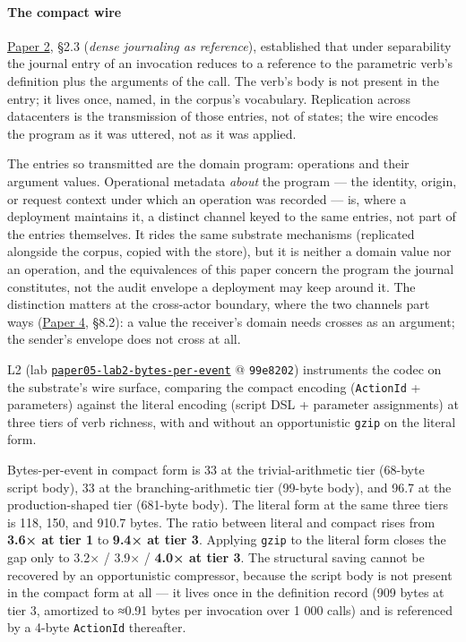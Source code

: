 \documentclass[
]{article}
\begin{document}
\paragraph{The compact wire}\label{the-compact-wire}

\href{02-program-value-separability.md}{Paper 2}, §2.3 (\emph{dense
journaling as reference}), established that under separability the
journal entry of an invocation reduces to a reference to the parametric
verb's definition plus the arguments of the call. The verb's body is not
present in the entry; it lives once, named, in the corpus's vocabulary.
Replication across datacenters is the transmission of those entries, not
of states; the wire encodes the program as it was uttered, not as it was
applied.

The entries so transmitted are the domain program: operations and their
argument values. Operational metadata \emph{about} the program --- the
identity, origin, or request context under which an operation was
recorded --- is, where a deployment maintains it, a distinct channel
keyed to the same entries, not part of the entries themselves. It rides
the same substrate mechanisms (replicated alongside the corpus, copied
with the store), but it is neither a domain value nor an operation, and
the equivalences of this paper concern the program the journal
constitutes, not the audit envelope a deployment may keep around it. The
distinction matters at the cross-actor boundary, where the two channels
part ways (\href{04-cross-actor-continuity.md}{Paper 4}, §8.2): a value
the receiver's domain needs crosses as an argument; the sender's
envelope does not cross at all.

L2 (lab
\href{data/paper05-lab2-bytes-per-event/}{\texttt{paper05-lab2-bytes-per-event}}
@ \texttt{99e8202}) instruments the codec on the substrate's wire
surface, comparing the compact encoding (\texttt{ActionId} + parameters)
against the literal encoding (script DSL + parameter assignments) at
three tiers of verb richness, with and without an opportunistic
\texttt{gzip} on the literal form.

Bytes-per-event in compact form is 33 at the trivial-arithmetic tier
(68-byte script body), 33 at the branching-arithmetic tier (99-byte
body), and 96.7 at the production-shaped tier (681-byte body). The
literal form at the same three tiers is 118, 150, and 910.7 bytes. The
ratio between literal and compact rises from \textbf{3.6× at tier 1} to
\textbf{9.4× at tier 3}. Applying \texttt{gzip} to the literal form
closes the gap only to 3.2× / 3.9× / \textbf{4.0× at tier 3}. The
structural saving cannot be recovered by an opportunistic compressor,
because the script body is not present in the compact form at all --- it
lives once in the definition record (909 bytes at tier 3, amortized to
≈0.91 bytes per invocation over 1 000 calls) and is referenced by a
4-byte \texttt{ActionId} thereafter.
\end{document}
